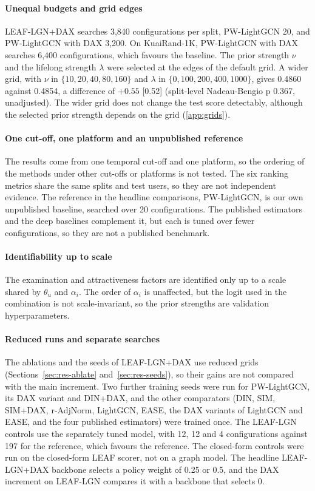\paragraph{Unequal budgets and grid edges} LEAF-LGN+DAX searches 3,840 configurations per split, PW-LightGCN 20, and PW-LightGCN with DAX 3,200. On
KuaiRand-1K, PW-LightGCN with DAX searches 6,400 configurations, which favours the baseline. The prior strength $\nu$ and the lifelong strength
$\lambda$ were selected at the edges of the default grid. A wider grid, with $\nu$ in $\{10,20,40,80,160\}$ and $\lambda$ in $\{0,100,200,400,1000\}$,
gives 0.4860 against 0.4854, a difference of $+0.55$ [0.52] (split-level Nadeau-Bengio p 0.367, unadjusted). The wider grid does not change the test score detectably, although the selected prior strength depends on the grid (\ref{app:grids}).

\paragraph{One cut-off, one platform and an unpublished reference} The results come from one temporal cut-off and one platform, so the ordering of the methods under other cut-offs or platforms is not tested. The six ranking metrics share the same splits and test users, so they are not independent evidence. The reference in the headline comparisons, PW-LightGCN, is our own unpublished baseline, searched over 20 configurations. The published estimators and the deep baselines complement it, but each is tuned over fewer configurations, so they are not a published benchmark.

\paragraph{Identifiability up to scale} The examination and attractiveness factors are identified only up to a scale shared by $\theta_u$ and
$\alpha_i$. The order of $\alpha_i$ is unaffected, but the logit used in the combination is not scale-invariant, so the prior strengths are
validation hyperparameters.

\paragraph{Reduced runs and separate searches} The ablations and the seeds of LEAF-LGN+DAX use reduced grids (Sections~\ref{sec:res-ablate}
and~\ref{sec:res-seeds}), so their gains are not compared with the main increment. Two further training seeds were run for PW-LightGCN, its DAX variant and DIN+DAX, and the other comparators (DIN, SIM, SIM+DAX, r-AdjNorm, LightGCN, EASE, the DAX variants of LightGCN and EASE, and the four published estimators) were trained once. The LEAF-LGN controls use the separately tuned model, with 12, 12 and 4 configurations against 197 for the
reference, which favours the reference. The closed-form controls were run on the closed-form LEAF scorer, not on a graph model. The headline
LEAF-LGN+DAX backbone selects a policy weight of 0.25 or 0.5, and the DAX increment on LEAF-LGN compares it with a backbone that selects 0.

